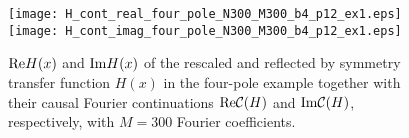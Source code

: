 \documentclass[journal,twoside]{IEEEtran}
\begin{document}
\begin{figure}[h] \begin{center}
\texttt{[image: H\_cont\_real\_four\_pole\_N300\_M300\_b4\_p12\_ex1.eps]}
\hspace{10pt}
\texttt{[image: H\_cont\_imag\_four\_pole\_N300\_M300\_b4\_p12\_ex1.eps]}
\end{center}
\caption{${\mathop{\rm Re}\nolimits} H(x)$ and ${\mathop{\rm Im}\nolimits} H(x)$ of the rescaled and reflected by symmetry  transfer function $H(x)$ in the four-pole example together with their causal Fourier continuations ${\mathop{\rm Re}\nolimits} {\mathcal C}(H)$ and ${\mathop{\rm Im}\nolimits} {\mathcal C}(H)$, respectively, with $M=300$ Fourier coefficients.} 
\label{Ffour_pole0_2}
\end{figure}
\end{document}
